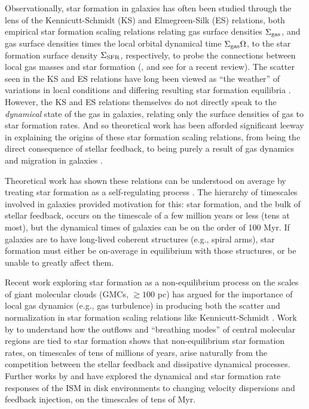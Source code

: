 \documentclass[usletter,fleqn,usenatbib]{mnras}
\begin{document}
Observationally, star formation in galaxies has often been studied through the lens of the Kennicutt-Schmidt (KS) and Elmegreen-Silk (ES) relations, both empirical star formation scaling relations relating gas surface densities $\Sigma_{\rm gas}$, and gas surface densities times the local orbital dynamical time $\Sigma_{\rm gas}\Omega$, to the star formation surface density $\Sigma_{\rm SFR}$, respectively, to probe the connections between local gas masses and star formation (\citealt{Kennicutt1989}, and see \citealt{Kennicutt2012} for a recent review).  The scatter seen in the KS and ES relations have long been viewed as ``the weather'' of variations in local conditions and differing resulting star formation equilibria \citep{Bigiel2008, Leroy2008, Leroy2013}.  However, the KS and ES relations themselves do not directly speak to the \emph{dynamical} state of the gas in galaxies, relating only the surface densities of gas to star formation rates.  And so theoretical work has been afforded significant leeway in explaining the origins of these star formation scaling relations, from being the direct consequence of stellar feedback, to being purely a result of gas dynamics and migration in galaxies \citep{Faucher-Giguere2013, Krumholz2016}.

Theoretical work has shown these relations can be understood on average by treating star formation as a self-regulating process \citep{Thompson2005, Ostriker2011, Faucher-Giguere2013, Hayward2017}.  The hierarchy of timescales involved in galaxies provided motivation for this: star formation, and the bulk of stellar feedback, occurs on the timescale of a few million years or less (tens at most), but the dynamical times of galaxies can be on the order of 100 Myr.  If galaxies are to have long-lived coherent structures (e.g., spiral arms), star formation must either be on-average in equilibrium with those structures, or be unable to greatly affect them. 




Recent work exploring star formation as a non-equilibrium process on the scales of giant molecular clouds (GMCs, $\gtrsim100$ pc) has argued for the importance of local gas dynamics (e.g., gas turbulence) in producing both the scatter and normalization in star formation scaling relations like Kennicutt-Schmidt \citep{Benincasa2016, Torrey2016, Sparre2017, Orr2019}. Work by \citet{Torrey2016} to understand how the outflows and ``breathing modes'' of central molecular regions are tied to star formation shows that non-equilibrium star formation rates, on timescales of tens of millions of years, arise naturally from the competition between the stellar feedback and dissipative dynamical processes.   Further works by \citet{Benincasa2016} and \citet{Orr2019} have explored the dynamical and star formation rate responses of the ISM in disk environments to changing velocity dispersions and feedback injection, on the timescales of tens of Myr.
\end{document}
